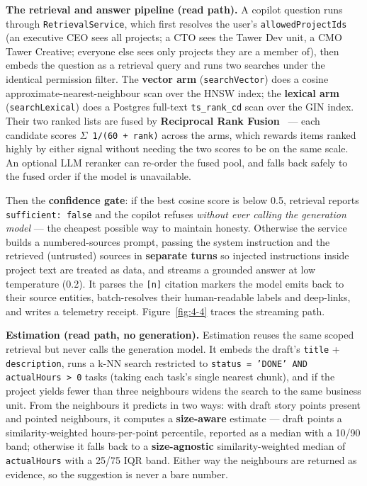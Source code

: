 
\textbf{The retrieval and answer pipeline (read path).} A copilot question runs through \texttt{RetrievalService}, which
first resolves the user's \texttt{allowedProjectIds} (an executive CEO sees all projects; a CTO sees the Tawer Dev
unit, a CMO Tawer Creative; everyone else sees only projects they are a member of), then embeds the question
as a retrieval query and runs two searches under the identical permission filter. The \textbf{vector arm}
(\texttt{searchVector}) does a cosine approximate-nearest-neighbour scan over the HNSW index; the \textbf{lexical arm}
(\texttt{searchLexical}) does a Postgres full-text \texttt{ts\_rank\_cd} scan over the GIN index. Their two ranked lists are
fused by \textbf{Reciprocal Rank Fusion}~\cite{cormack2009rrf} --- each candidate scores \texttt{$\Sigma$ 1/(60 + rank)} across the arms, which rewards
items ranked highly by either signal without needing the two scores to be on the same scale. An optional LLM
reranker can re-order the fused pool, and falls back safely to the fused order if the model is unavailable.

Then the \textbf{confidence gate}: if the best cosine score is below 0.5, retrieval reports \texttt{sufficient: false} and
the copilot refuses \emph{without ever calling the generation model} --- the cheapest possible way to maintain honesty.
Otherwise the service builds a numbered-sources prompt, passing the system instruction and the retrieved
(untrusted) sources in \textbf{separate turns} so injected instructions inside project text are treated as data,
and streams a grounded answer at low temperature (0.2). It parses the \texttt{[n]} citation markers the model emits
back to their source entities, batch-resolves their human-readable labels and deep-links, and writes a
telemetry receipt. Figure~\ref{fig:4-4} traces the streaming path.


\textbf{Estimation (read path, no generation).} Estimation reuses the same scoped retrieval but never calls the
generation model. It embeds the draft's \texttt{title} + \texttt{description}, runs a k-NN search restricted to \texttt{status = 'DONE' AND actualHours > 0} tasks (taking each task's single nearest chunk), and if the project yields fewer
than three neighbours widens the search to the same business unit. From the neighbours it predicts in two ways:
with draft story points present and pointed neighbours, it computes a \textbf{size-aware} estimate --- draft points \texttimes{}
a similarity-weighted hours-per-point percentile, reported as a median with a 10/90 band; otherwise it falls
back to a \textbf{size-agnostic} similarity-weighted median of \texttt{actualHours} with a 25/75 IQR band. Either way the
neighbours are returned as evidence, so the suggestion is never a bare number.

